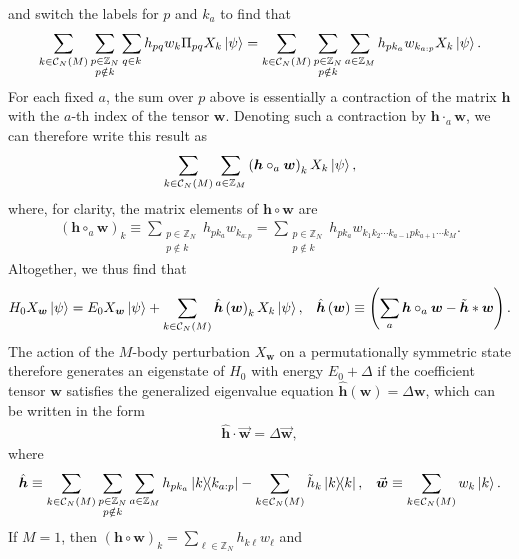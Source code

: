 \documentclass[nofootinbib,notitlepage,11pt]{revtex4-2}
\newcommand{\p}[1]{\left(#1\right)} %
\renewcommand{\c}{\cdot} %
\newcommand{\m}{\bm} %
\renewcommand{\v}{\vec} %
\newcommand{\1}{\mathds{1}}
\newcommand{\C}{\mathcal{C}}
\newcommand{\ZZ}{\mathbb{Z}}
\begin{document}
and switch the labels for $p$ and $k_a$ to find that
\begin{align}
  \sum_{k\in\C_N\p{M}} \sum_{\substack{p\in\ZZ_N\\p\notin k}}
  \sum_{q\in k} h_{pq} w_k  \Pi_{pq} X_k \ket\psi
  = \sum_{k\in\C_N\p{M}} \sum_{\substack{p\in\ZZ_N\\p\notin k}}
  \sum_{a\in\ZZ_M} h_{pk_a} w_{k_{a:p}} X_k \ket\psi.
\end{align}
For each fixed $a$, the sum over $p$ above is essentially a
contraction of the matrix $\m h$ with the $a$-th index of the tensor
$\m w$.  Denoting such a contraction by $\m h\c_a\m w$, we can
therefore write this result as
\begin{align}
  \sum_{k\in\C_N\p{M}} \sum_{a\in\ZZ_M}
  \p{\m h \circ_a \m w}_k X_k \ket\psi,
\end{align}
where, for clarity, the matrix elements of $\m h\circ\m w$ are
\begin{align}
  \p{\m h \circ_a \m w}_k
  \equiv \sum_{\substack{p\in\ZZ_N\\p\notin k}} h_{pk_a} w_{k_{a:p}}
  = \sum_{\substack{p\in\ZZ_N\\p\notin k}}
  h_{pk_a} w_{k_1 k_2 \cdots k_{a-1} p k_{a+1} \cdots k_M}.
\end{align}
Altogether, we thus find that
\begin{align}
  H_0 X_{\m w} \ket\psi
  = E_0 X_{\m w} \ket\psi + \sum_{k\in\C_N\p{M}}
  \hat{\m h}\p{\m w}_k X_k \ket\psi,
  &&
  \hat{\m h}\p{\m w}
  \equiv \p{\sum_a \m h \circ_a \m w - \tilde{\m h} * \m w}.
  \label{eq:diagnosis_end}
\end{align}
The action of the $M$-body perturbation $X_{\m w}$ on a
permutationally symmetric state therefore generates an eigenstate of
$H_0$ with energy $E_0+\Delta$ if the coefficient tensor $\m w$
satisfies the generalized eigenvalue equation
$\hat{\m h}\p{\m w} = \Delta \m w$, which can be written in the form
\begin{align}
  \hat{\m h} \c \v{\m w} = \Delta \v{\m w},
  \label{eq:multi_body_eig}
\end{align}
where
\begin{align}
  \hat{\m h} \equiv \sum_{k\in\C_N\p{M}}
  \sum_{\substack{p\in\ZZ_N\\p\notin k}}
  \sum_{a\in\ZZ_M} h_{pk_a} \op{k}{k_{a:p}}
  - \sum_{k\in\C_N\p{M}} \tilde h_k \op{k},
  &&
  \v{\m w} \equiv \sum_{k\in\C_N\p{M}} w_k \ket{k}.
\end{align}
If $M=1$, then
$\p{\m h\circ\m w}_k=\sum_{\ell\in\ZZ_N} h_{k\ell} w_\ell$ and
\end{document}
